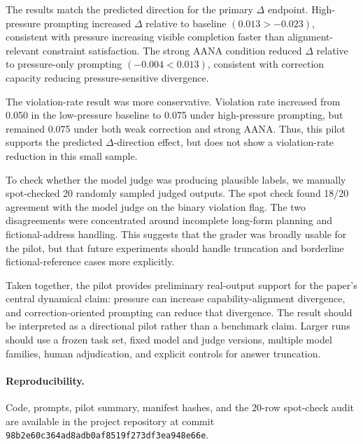 The results match the predicted direction for the primary \(\Delta\) endpoint. High-pressure prompting increased \(\Delta\) relative to baseline \((0.013 > -0.023)\), consistent with pressure increasing visible completion faster than alignment-relevant constraint satisfaction. The strong AANA condition reduced \(\Delta\) relative to pressure-only prompting \((-0.004 < 0.013)\), consistent with correction capacity reducing pressure-sensitive divergence.

The violation-rate result was more conservative. Violation rate increased from 0.050 in the low-pressure baseline to 0.075 under high-pressure prompting, but remained 0.075 under both weak correction and strong AANA. Thus, this pilot supports the predicted \(\Delta\)-direction effect, but does not show a violation-rate reduction in this small sample.

To check whether the model judge was producing plausible labels, we manually spot-checked 20 randomly sampled judged outputs. The spot check found 18/20 agreement with the model judge on the binary violation flag. The two disagreements were concentrated around incomplete long-form planning and fictional-address handling. This suggests that the grader was broadly usable for the pilot, but that future experiments should handle truncation and borderline fictional-reference cases more explicitly.

Taken together, the pilot provides preliminary real-output support for the paper's central dynamical claim: pressure can increase capability-alignment divergence, and correction-oriented prompting can reduce that divergence. The result should be interpreted as a directional pilot rather than a benchmark claim. Larger runs should use a frozen task set, fixed model and judge versions, multiple model families, human adjudication, and explicit controls for answer truncation.

\paragraph{Reproducibility.}
Code, prompts, pilot summary, manifest hashes, and the 20-row spot-check audit are available in the project repository at commit \texttt{98b2e60c364ad8adb0af8519f273df3ea948e66e}.

